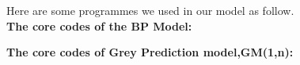 \begin{appendices}
   



Here are some programmes we used in our model as follow.\\


\textbf{\textcolor[rgb]{0.98,0.00,0.00}{The core codes of the BP Model:}}



\textbf{\textcolor[rgb]{0.98,0.00,0.00}{The core codes of Grey Prediction model,GM(1,n):}}

\end{appendices}
